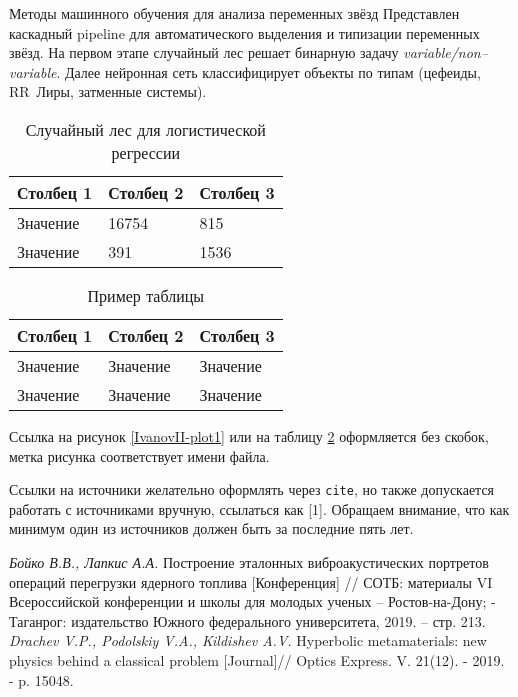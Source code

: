 \documentclass[oneside, a5paper,10pt]{article}
\begin{document}

\makeInf
{Методы машинного обучения для анализа переменных звёзд}
{Представлен каскадный pipeline для автоматического выделения и типизации переменных звёзд. 
На первом этапе случайный лес решает бинарную задачу \textit{variable/non–variable}. 
Далее нейронная сеть классифицирует объекты по типам (цефеиды, RR~Лиры, затменные системы).}
{
\begin{table}[h!]
	\caption{Случайный лес для логистической регрессии}
	\centering
	\begin{tabular}{ | l | l | l | }
		\hline
		Столбец 1 & Столбец 2 & Столбец 3 \\
		\hline
		Значение & 16754 & 815\\
		\hline
		Значение & 391 & 1536 \\
		\hline
	\end{tabular}
	\label{table:IvanovII-table1}
\end{table}


\begin{table}[h!]
	\caption{Пример таблицы}
	\centering
	\begin{tabular}{ | l | l | l | }
		\hline
		Столбец 1 & Столбец 2 & Столбец 3 \\
		\hline
		Значение & Значение & Значение\\
		\hline
		Значение & Значение & Значение \\
		\hline
	\end{tabular}
	\label{table:IvanovII-table1}
\end{table}

Ссылка на рисунок \ref{IvanovII-plot1} или на таблицу \ref{table:IvanovII-table1} оформляется без скобок, метка рисунка соответствует имени файла.

Ссылки на источники желательно оформлять через \texttt{cite}, но также допускается работать с источниками вручную, ссылаться как [1]. Обращаем внимание, что как минимум один из источников должен быть за последние пять лет.

\begin{thebibliography}{9}
	\textit{Бойко В.В., Лапкис А.А.} Построение эталонных виброакустических портретов операций перегрузки
	ядерного топлива [Конференция] // СОТБ: материалы VI Всероссийской конференции и школы для молодых ученых
	– Ростов-на-Дону; - Таганрог: издательство Южного федерального университета, 2019. – стр. 213. 
	\textit{Drachev V.P., Podolskiy V.A., Kildishev A.V.} Hyperbolic metamaterials: new physics behind
	a classical problem [Journal]// Optics Express. V. 21(12). - 2019. - p. 15048.
\end{thebibliography}
}
\end{document}
